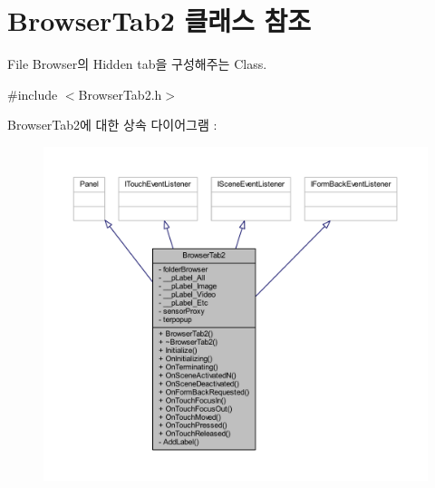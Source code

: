 \hypertarget{class_browser_tab2}{\section{Browser\+Tab2 클래스 참조}
\label{class_browser_tab2}
}


File Browser의 Hidden tab을 구성해주는 Class.  




{\ttfamily \#include $<$Browser\+Tab2.\+h$>$}



Browser\+Tab2에 대한 상속 다이어그램 \+: 
\nopagebreak
\begin{figure}[H]
\begin{center}
\leavevmode
\includegraphics[width=350pt]{class_browser_tab2__inherit__graph}
\end{center}
\end{figure}


